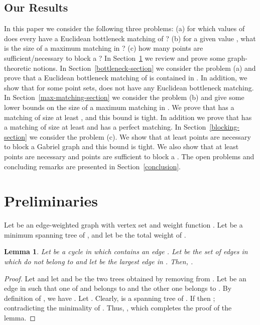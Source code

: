 \documentclass[11pt,a4paper]{article}
\newcommand{\kGG}[2]{}
\newtheorem{lemma}{Lemma}
\begin{document}
\subsection{Our Results}
In this paper we consider the following three problems: (a) for which values of  does every \kGG{k}{} have a Euclidean bottleneck matching of ? (b) for a given value , what is the size of a maximum matching in \kGG{k}{}? (c) how many points are sufficient/necessary to block a \kGG{k}{}? In Section~\ref{preliminaries} we review and prove some graph-theoretic notions. In Section~\ref{bottleneck-section} we consider the problem (a) and prove that a Euclidean bottleneck matching of  is contained in \kGG{10}{}. In addition, we show that for some point sets, \kGG{8}{} does not have any Euclidean bottleneck matching. In Section~\ref{max-matching-section} we consider the problem (b) and give some lower bounds on the size of a maximum matching in \kGG{k}{}. We prove that \kGG{0}{} has a matching of size at least , and this bound is tight. In addition we prove that \kGG{1}{} has a matching of size at least  and \kGG{2}{} has a perfect matching. In Section~\ref{blocking-section} we consider the problem (c). We show that at least  points are necessary to block a Gabriel graph and this bound is tight. We also show that at least  points are necessary and  points are sufficient to block a \kGG{k}{}. The open problems and concluding remarks are presented in Section~\ref{conclusion}.

\section{Preliminaries}
\label{preliminaries}
Let  be an edge-weighted graph with vertex set  and weight function . Let  be a minimum spanning tree of , and let  be the total weight of . 

\begin{lemma}
\label{not-mst-edge}
Let  be a cycle in  which contains an edge . Let  be the set of edges in  which do not belong to  and let  be the largest edge in . Then, .
\end{lemma}

\begin{proof}
Let  and let  and  be the two trees obtained by removing  from . Let  be an edge in  such that one of  and  belongs to  and the other one belongs to . By definition of , we have . Let . Clearly,  is a spanning tree of . If  then ; contradicting the minimality of . Thus, , which completes the proof of the lemma. 
\end{proof}
 
\end{document}
